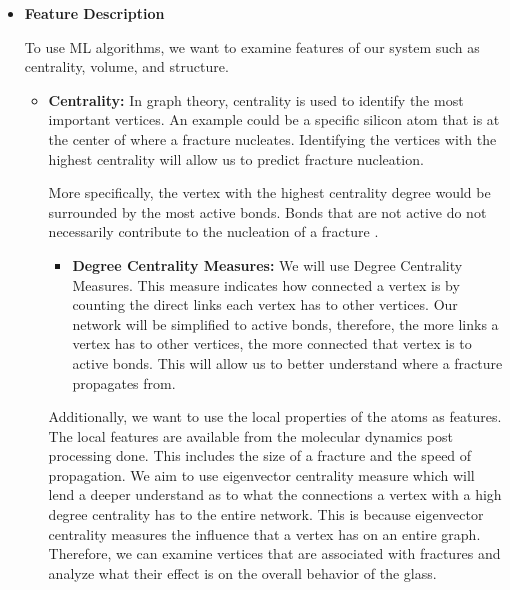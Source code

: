 \begin{itemize}
\begin{itemize}
\end{itemize}


\item \textbf{Feature Description}
\bigskip

To use ML algorithms, we want to examine features of our system such as centrality, volume, and structure.

\begin{itemize}
    \item \textbf{Centrality:} In graph theory, centrality is used to identify the most important vertices. An example could be a specific silicon atom that is at the center of where a fracture nucleates. Identifying the vertices with the highest centrality will allow us to predict fracture nucleation.
    
    \bigskip
    
    More specifically, the vertex with the highest centrality degree would be surrounded by the most active bonds. Bonds that are not active do not necessarily contribute to the nucleation of a fracture \cite{valera2018machine}.
    
    \begin{itemize}
        \item \textbf{Degree Centrality Measures:} We will use Degree Centrality Measures. This measure indicates how connected a vertex is by counting the direct links each vertex has to other vertices. Our network will be simplified to active bonds, therefore, the more links a vertex has to other vertices, the more connected that vertex is to active bonds. This will allow us to better understand where a fracture propagates from. 
    \end{itemize}
    
    \bigskip
    
    Additionally, we want to use the local properties of the atoms as features. The local features are available from the molecular dynamics post processing done. 
    This includes the size of a fracture and the speed of propagation. We aim to use eigenvector centrality measure which will lend a deeper understand as to what the connections a vertex with a high degree centrality has to the entire network. This is because eigenvector centrality measures the influence that a vertex has on an entire graph. Therefore, we can examine vertices that are associated with fractures and analyze what their effect is on the overall behavior of the glass.
    

\end{itemize}
\end{itemize}
